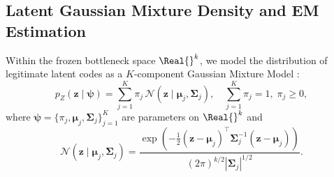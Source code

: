 \subsection{Latent Gaussian Mixture Density and EM Estimation}
\label{sec:p2_latent_em}
Within the frozen bottleneck space $\Real{}^k$, we model the distribution of legitimate latent codes as a $K$-component Gaussian Mixture Model \cite{bishop2006pattern, mclachlan2000finite}:
\begin{equation}
    p_Z(\mathbf{z} \mid \boldsymbol{\psi}) = \sum_{j=1}^K \pi_j \, \mathcal{N}(\mathbf{z} \mid \boldsymbol{\mu}_j, \boldsymbol{\Sigma}_j),
    \quad \sum_{j=1}^K \pi_j = 1, \; \pi_j \ge 0,
    \label{eq:latent_gmm_density}
\end{equation}
where $\boldsymbol{\psi} = \{\pi_j, \boldsymbol{\mu}_j, \boldsymbol{\Sigma}_j\}_{j=1}^K$ are parameters on $\Real{}^k$ and
\begin{equation}
    \mathcal{N}(\mathbf{z} \mid \boldsymbol{\mu}_j, \boldsymbol{\Sigma}_j) =
    \frac{\exp\!\left(-\frac{1}{2}(\mathbf{z} - \boldsymbol{\mu}_j)^\top \boldsymbol{\Sigma}_j^{-1} (\mathbf{z} - \boldsymbol{\mu}_j)\right)}{(2\pi)^{k/2} |\boldsymbol{\Sigma}_j|^{1/2}}.
    \label{eq:latent_gaussian}
\end{equation}

